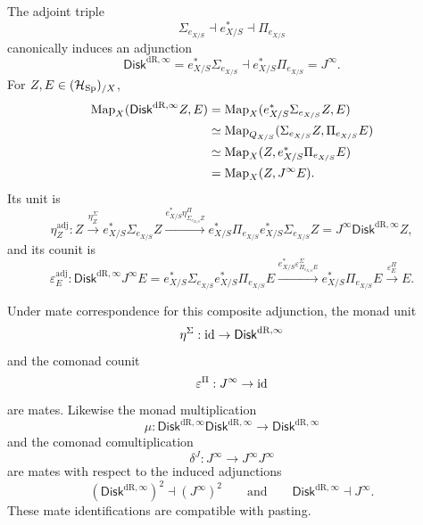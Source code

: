 \begin{theorem}
\label{thm:adjoint-triple-mates}
The adjoint triple
\[
  \Sigma_{e_{X/S}}\dashv e_{X/S}^*\dashv\Pi_{e_{X/S}}
\]
canonically induces an adjunction
\[
  \mathsf{Disk}^{\mathrm{dR},\infty}=e_{X/S}^*\Sigma_{e_{X/S}}
  \dashv
  e_{X/S}^*\Pi_{e_{X/S}}=J^\infty.
\]
For \(Z,E\in(\mathcal H_{\operatorname{Sp}})_{/X}\),
\[
\begin{aligned}
  \operatorname{Map}_X(\mathsf{Disk}^{\mathrm{dR},\infty} Z,E)
  &=
  \operatorname{Map}_X(e_{X/S}^*\Sigma_{e_{X/S}} Z,E)\\
  &\simeq
  \operatorname{Map}_{Q_{X/S}}(\Sigma_{e_{X/S}} Z,\Pi_{e_{X/S}} E)\\
  &\simeq
  \operatorname{Map}_X(Z,e_{X/S}^*\Pi_{e_{X/S}} E)\\
  &=
  \operatorname{Map}_X(Z,J^\infty E).
\end{aligned}
\]
Its unit is
\[
  \eta^{\mathrm{adj}}_Z:
  Z
  \xrightarrow{\eta^\Sigma_Z}
  e_{X/S}^*\Sigma_{e_{X/S}} Z
  \xrightarrow{e_{X/S}^*\eta^\Pi_{\Sigma_{e_{X/S}} Z}}
  e_{X/S}^*\Pi_{e_{X/S}}e_{X/S}^*\Sigma_{e_{X/S}} Z
  =
  J^\infty \mathsf{Disk}^{\mathrm{dR},\infty} Z,
\]
and its counit is
\[
  \varepsilon^{\mathrm{adj}}_E:
  \mathsf{Disk}^{\mathrm{dR},\infty} J^\infty E
  =
  e_{X/S}^*\Sigma_{e_{X/S}}e_{X/S}^*\Pi_{e_{X/S}} E
  \xrightarrow{e_{X/S}^*\varepsilon^\Sigma_{\Pi_{e_{X/S}} E}}
  e_{X/S}^*\Pi_{e_{X/S}} E
  \xrightarrow{\varepsilon^\Pi_E}
  E.
\]

Under mate correspondence for this composite adjunction,
the monad unit
\[
  \eta^\Sigma:\operatorname{id}\to \mathsf{Disk}^{\mathrm{dR},\infty}
\]
and the comonad counit
\[
  \varepsilon^\Pi:J^\infty\to\operatorname{id}
\]
are mates. Likewise the monad multiplication
\[
  \mu:\mathsf{Disk}^{\mathrm{dR},\infty} \mathsf{Disk}^{\mathrm{dR},\infty}\to \mathsf{Disk}^{\mathrm{dR},\infty}
\]
and the comonad comultiplication
\[
  \delta^J:J^\infty\to J^\infty J^\infty
\]
are mates with respect to the induced adjunctions
\[
  (\mathsf{Disk}^{\mathrm{dR},\infty})^2\dashv(J^\infty)^2
  \qquad\text{and}\qquad
  \mathsf{Disk}^{\mathrm{dR},\infty}\dashv J^\infty.
\]
These mate identifications are compatible with pasting.

\end{theorem}

